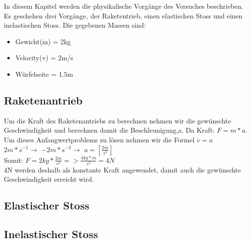 \documentclass[../main.tex]{subfiles}
\begin{document}
In diesem Kapitel werden die physikalische Vorgänge des Versuches beschrieben. Es geschehen drei Vorgänge, der Raketentrieb, einen elastischen Stoss und einen inelastischen Stoss.
Die gegebenen Massen sind:
\begin{itemize}
	\item Gewicht(m) = 2kg
	\item Velocity(v) = 2m/s
	\item Würfelseite = 1.5m
\end{itemize}

\subsection{Raketenantrieb\\}
Um die Kraft des Raketenantriebs zu berechnen nehmen wir die gewünschte Geschwindigkeit und berechnen damit die Beschleunigung,a. Da Kraft: $F = m*a$.\\
Um dieses Anfangwertproblems zu lösen nehmen wir die Formel $\dot{v} = a$\\
$2m*s^{-1} \rightarrow$  $-2m*s^{-2} \rightarrow$  $a = [\frac{2m}{s^{2}}]$\\
Somit:
$F = 2kg * \frac{2m}{s^{2}} => \frac{4kg*m}{s^{2}} = 4N$\\
4N werden deshalb als konstante Kraft angewendet, damit auch die gewünschte Geschwindigkeit erreicht wird.








\subsection{Elastischer Stoss}
\subsection{Inelastischer Stoss}




\subsection{}
\end{document}
